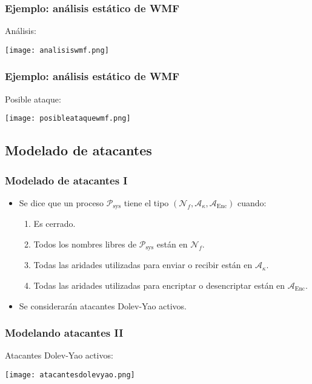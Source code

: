 \documentclass{beamer}
\begin{document}
\begin{frame}
    \frametitle{Ejemplo: análisis estático de WMF}
    \pause
    Análisis:
    \pause[3]
    \begin{center}
        \texttt{[image: analisiswmf.png]}
    \end{center}
\end{frame}

\begin{frame}
    \frametitle{Ejemplo: análisis estático de WMF}
    \pause
    Posible ataque:
    \pause[3]
    \begin{center}
        \texttt{[image: posibleataquewmf.png]}
    \end{center}
\end{frame}

\subsection{Modelado de atacantes}

\begin{frame}
    \frametitle{Modelado de atacantes I}
    \pause
    \begin{itemize}
    \item<2-> Se dice que un proceso \(\mathcal{P}_{\text{sys}}\) tiene el tipo \((\mathcal{N}_f, \mathcal{A}_\kappa, \mathcal{A}_{\text{Enc}})\) cuando:
    \begin{enumerate}
        \item Es cerrado.
        \item Todos los nombres libres de \(\mathcal{P}_{\text{sys}}\) están en \(\mathcal{N}_f\).
        \item Todas las aridades utilizadas para enviar o recibir están en \(\mathcal{A}_\kappa\).
        \item Todas las aridades utilizadas para encriptar o desencriptar están en \(\mathcal{A}_{\text{Enc}}\).
    \end{enumerate}
    \item<3-> Se considerarán atacantes Dolev-Yao activos.
    \end{itemize}
\end{frame}

\begin{frame}
    \frametitle{Modelando atacantes II}
    \pause
    Atacantes Dolev-Yao activos:
    \pause[3]
    \begin{center}
        \texttt{[image: atacantesdolevyao.png]}
    \end{center}
\end{frame}
\end{document}
